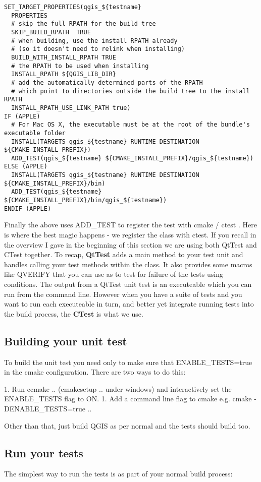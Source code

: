 \begin{verbatim}
SET_TARGET_PROPERTIES(qgis_${testname}
  PROPERTIES
  # skip the full RPATH for the build tree
  SKIP_BUILD_RPATH  TRUE
  # when building, use the install RPATH already
  # (so it doesn't need to relink when installing)
  BUILD_WITH_INSTALL_RPATH TRUE
  # the RPATH to be used when installing
  INSTALL_RPATH ${QGIS_LIB_DIR}
  # add the automatically determined parts of the RPATH
  # which point to directories outside the build tree to the install RPATH
  INSTALL_RPATH_USE_LINK_PATH true)
IF (APPLE)
  # For Mac OS X, the executable must be at the root of the bundle's executable folder
  INSTALL(TARGETS qgis_${testname} RUNTIME DESTINATION ${CMAKE_INSTALL_PREFIX})
  ADD_TEST(qgis_${testname} ${CMAKE_INSTALL_PREFIX}/qgis_${testname})
ELSE (APPLE)
  INSTALL(TARGETS qgis_${testname} RUNTIME DESTINATION ${CMAKE_INSTALL_PREFIX}/bin)
  ADD_TEST(qgis_${testname} ${CMAKE_INSTALL_PREFIX}/bin/qgis_${testname})
ENDIF (APPLE)
\end{verbatim}

Finally the above uses ADD\_TEST to register the test with cmake / ctest . Here
is where the best magic happens - we register the class with ctest. If you
recall in the overview I gave in the beginning of this section we are using
both QtTest and CTest together. To recap, \textbf{QtTest} adds a main method to your
test unit and handles calling your test methods within the class. It also
provides some macros like QVERIFY that you can use as to test for failure of
the tests using conditions. The output from a QtTest unit test is an
executeable which you can run from the command line.  However when you have a
suite of tests and you want to run each executeable in turn, and better yet
integrate running tests into the build process, the \textbf{CTest} is what we use. 

\subsection{Building your unit test}
To build the unit test you need only to make sure that ENABLE\_TESTS=true in the
cmake configuration. There are two ways to do this:

 1. Run ccmake .. (cmakesetup .. under windows) and interactively set 
 the ENABLE\_TESTS flag to ON.
 1. Add a command line flag to cmake e.g. cmake -DENABLE\_TESTS=true ..

Other than that, just build QGIS as per normal and the tests should build too.

\subsection{Run your tests}
The simplest way to run the tests is as part of your normal build process:


